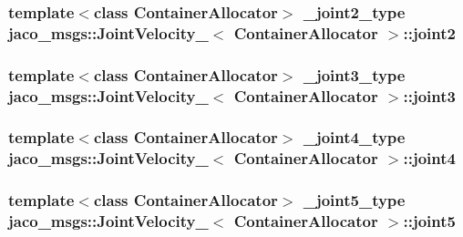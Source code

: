 \subsubsection[{\texorpdfstring{joint2}{joint2}}]{\setlength{\rightskip}{0pt plus 5cm}template$<$class Container\+Allocator$>$ {\bf \+\_\+joint2\+\_\+type} {\bf jaco\+\_\+msgs\+::\+Joint\+Velocity\+\_\+}$<$ Container\+Allocator $>$\+::joint2}\hypertarget{structjaco__msgs_1_1JointVelocity___a4cb4b1f563bb3df4c9f2471f4682e33d}{}\label{structjaco__msgs_1_1JointVelocity___a4cb4b1f563bb3df4c9f2471f4682e33d}
\subsubsection[{\texorpdfstring{joint3}{joint3}}]{\setlength{\rightskip}{0pt plus 5cm}template$<$class Container\+Allocator$>$ {\bf \+\_\+joint3\+\_\+type} {\bf jaco\+\_\+msgs\+::\+Joint\+Velocity\+\_\+}$<$ Container\+Allocator $>$\+::joint3}\hypertarget{structjaco__msgs_1_1JointVelocity___aa14dad415721aae4794da85ea545843f}{}\label{structjaco__msgs_1_1JointVelocity___aa14dad415721aae4794da85ea545843f}
\subsubsection[{\texorpdfstring{joint4}{joint4}}]{\setlength{\rightskip}{0pt plus 5cm}template$<$class Container\+Allocator$>$ {\bf \+\_\+joint4\+\_\+type} {\bf jaco\+\_\+msgs\+::\+Joint\+Velocity\+\_\+}$<$ Container\+Allocator $>$\+::joint4}\hypertarget{structjaco__msgs_1_1JointVelocity___a42d5c803c0510958d3ea50a5195fd430}{}\label{structjaco__msgs_1_1JointVelocity___a42d5c803c0510958d3ea50a5195fd430}
\subsubsection[{\texorpdfstring{joint5}{joint5}}]{\setlength{\rightskip}{0pt plus 5cm}template$<$class Container\+Allocator$>$ {\bf \+\_\+joint5\+\_\+type} {\bf jaco\+\_\+msgs\+::\+Joint\+Velocity\+\_\+}$<$ Container\+Allocator $>$\+::joint5}\hypertarget{structjaco__msgs_1_1JointVelocity___af03f322785d0b58fbd4bd639ad48545c}{}\label{structjaco__msgs_1_1JointVelocity___af03f322785d0b58fbd4bd639ad48545c}
